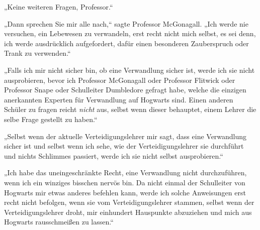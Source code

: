 „Keine weiteren Fragen, Professor.“

„Dann sprechen Sie mir alle nach,“ sagte Professor McGonagall. „Ich werde nie versuchen, ein Lebewesen zu verwandeln, erst recht nicht mich selbst, es sei denn, ich werde ausdrücklich aufgefordert, dafür einen besonderen Zauberspruch oder Trank zu verwenden.“

„Falls ich mir nicht sicher bin, ob eine Verwandlung sicher ist, werde ich sie nicht ausprobieren, bevor ich Professor McGonagall oder Professor Flitwick oder Professor Snape oder Schulleiter Dumbledore gefragt habe, welche die einzigen anerkannten Experten für Verwandlung auf Hogwarts sind. Einen anderen Schüler zu fragen reicht \emph{nicht} aus, selbst wenn dieser behauptet, einem Lehrer die selbe Frage gestellt zu haben.“

„Selbst wenn der aktuelle Verteidigungslehrer mir sagt, dass eine Verwandlung sicher ist und selbst wenn ich sehe, wie der Verteidigungslehrer sie durchführt und nichts Schlimmes passiert, werde ich sie nicht selbst ausprobieren.“

„Ich habe das uneingeschränkte Recht, eine Verwandlung nicht durchzuführen, wenn ich ein winziges bisschen nervös bin. Da nicht einmal der Schulleiter von Hogwarts mir etwas anderes befehlen kann, werde ich solche Anweisungen erst recht nicht befolgen, wenn sie vom Verteidigungslehrer stammen, selbst wenn der Verteidigungslehrer droht, mir einhundert Hauspunkte abzuziehen und mich aus Hogwarts rausschmeißen zu lassen.“

